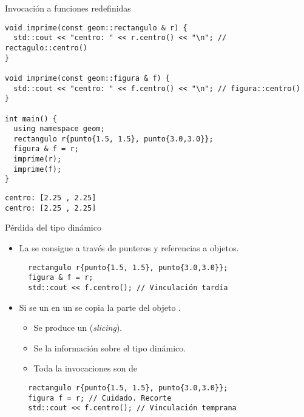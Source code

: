 \begin{frame}[t,fragile]{Invocación a funciones redefinidas}
\begin{lstlisting}
void imprime(const geom::rectangulo & r) {
  std::cout << "centro: " << r.centro() << "\n"; // rectagulo::centro()
}

void imprime(const geom::figura & f) {
  std::cout << "centro: " << f.centro() << "\n"; // figura::centro()
}

int main() {
  using namespace geom;
  rectangulo r{punto{1.5, 1.5}, punto{3.0,3.0}};
  figura & f = r;
  imprime(r);
  imprime(f);
}
\end{lstlisting}

\begin{lstlisting}[style=terminal]
centro: [2.25 , 2.25]
centro: [2.25 , 2.25]
\end{lstlisting}

\end{frame}

\begin{frame}[t,fragile]{Pérdida del tipo dinámico}
\begin{itemize}
  \item La  se consigue a través de 
        punteros y referencias a objetos.
\begin{lstlisting}
  rectangulo r{punto{1.5, 1.5}, punto{3.0,3.0}};
  figura & f = r;
  std::cout << f.centro(); // Vinculación tardía
\end{lstlisting}

  \item Si se  un  en un 
        se copia  la parte del objeto .
    \begin{itemize}
      \item Se produce un  (\emph{slicing}).
      \item Se  la información sobre el tipo dinámico.
      \item Toda la invocaciones son de 
    \end{itemize}
\begin{lstlisting}
  rectangulo r{punto{1.5, 1.5}, punto{3.0,3.0}};
  figura f = r; // Cuidado. Recorte
  std::cout << f.centro(); // Vinculación temprana
\end{lstlisting}
\end{itemize}
\end{frame}

